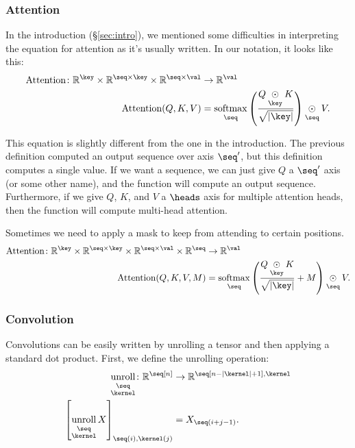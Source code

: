 \documentclass{article}
\newcommand{\reals}{\mathbb{R}}
\begin{document}
\subsubsection{Attention}
\label{sec:attention}

In the introduction (\S\ref{sec:intro}), we mentioned some difficulties in interpreting the equation for attention as it's usually written. In our notation, it looks like this:
\begin{align*}
  \text{Attention} \colon \mathbb{R}^{\key} \times \mathbb{R}^{\seq \times\key} \times \mathbb{R}^{\seq \times\val} &\rightarrow \mathbb{R}^{\val} \\
  \text{Attention}(Q,K,V) &= \nfun{\seq}{softmax} \left( \frac{Q \ndot{\key} K}{\sqrt{|\key|}} \right) \ndot{\seq} V.
\end{align*}

This equation is slightly different from the one in the introduction. The previous definition computed an output sequence over axis $\seq'$, but this definition computes a single value. If we want a sequence, we can just give $Q$ a $\seq'$ axis (or some other name), and the function will compute an output sequence. Furthermore, if we give $Q$, $K$, and $V$ a $\heads$ axis for multiple attention heads, then the function will compute multi-head attention.

Sometimes we need to apply a mask to keep from attending to certain positions.
\begin{align*}
  \text{Attention} \colon \mathbb{R}^{\key} \times \mathbb{R}^{\seq \times\key} \times \mathbb{R}^{\seq \times\val} \times \mathbb{R}^{\seq} &\rightarrow \mathbb{R}^{\val} \\
\text{Attention}(Q, K, V, M) &= \nfun{\seq}{softmax} \left( \frac{Q \ndot{\key} K}{\sqrt{|\key|}} + M \right) \ndot{\seq} V.
\end{align*}

\subsubsection{Convolution}

Convolutions can be easily written by unrolling a tensor and then
applying a standard dot product. First, we define the unrolling operation:
\begin{align*}
  \nfun{\seq \\ \kernel}{unroll} \colon \reals^{\seq[n]} &\rightarrow \reals^{\seq[n-|\kernel|+1], \kernel} \\
  \left[\nfun{\seq \\ \kernel}{unroll} X\right]_{\seq(i), \kernel(j)} &= X_{\seq(i+j - 1)}.
\end{align*}
\end{document}
